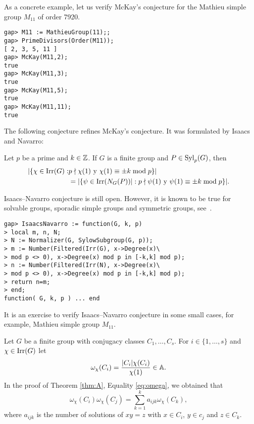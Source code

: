 As a concrete example, let us 
verify McKay's conjecture for the Mathieu simple group 
$M_{11}$ of order 7920. 

\begin{lstlisting}
gap> M11 := MathieuGroup(11);;
gap> PrimeDivisors(Order(M11));
[ 2, 3, 5, 11 ]
gap> McKay(M11,2);
true
gap> McKay(M11,3);
true
gap> McKay(M11,5);
true
gap> McKay(M11,11);
true
\end{lstlisting}

The following conjecture refines McKay's conjecture. It was
formulated by Isaacs and Navarro:

\begin{conjecture}
\label{conjecture:IsaacsNavarro}
Let $p$ be a prime and $k\in\mathbb{Z}$. 
If $G$ is a finite group and $P\in\mathrm{Syl}_p(G)$,
then
\begin{align*}
|\{\chi\in\operatorname{Irr}(G):&p\nmid \chi(1)\text{ y }\chi(1)\equiv\pm k\bmod p\}|\\
&=|\{\psi\in\operatorname{Irr}(N_G(P))|:p\nmid\psi(1)\text{ y }\psi(1)\equiv\pm k\bmod p\}|.
\end{align*}
\end{conjecture}

Isaacs--Navarro conjecture is still open. However, 
it is known to be true for solvable groups, 
sporadic simple groups and 
symmetric groups, see~\cite{MR1935849}. 

\begin{lstlisting}
gap> IsaacsNavarro := function(G, k, p)
> local m, n, N;
> N := Normalizer(G, SylowSubgroup(G, p));
> m := Number(Filtered(Irr(G), x->Degree(x)\
> mod p <> 0), x->Degree(x) mod p in [-k,k] mod p);
> n := Number(Filtered(Irr(N), x->Degree(x)\
> mod p <> 0), x->Degree(x) mod p in [-k,k] mod p);
> return n=m;
> end;
function( G, k, p ) ... end
\end{lstlisting}

It is an exercise to verify Isaacs--Navarro conjecture in some
small cases, for example, Mathieu simple group $M_{11}$. 

\label{commutators}

Let $G$ be a finite group with conjugacy classes $C_1,\dots,C_s$. For
$i\in\{1,\dots,s\}$ and $\chi\in\operatorname{Irr}(G)$ let  
\[
\omega_{\chi}(C_i)=\frac{|C_i|\chi(C_i)}{\chi(1)}\in\mathbb{A}.
\]
In the proof of Theorem \ref{thm:A}, Equality \eqref{eq:omega}, 
we obtained
that 
\begin{equation}
\label{eq:again_omega}
\omega_\chi(C_i)\omega_\chi(C_j)=\sum_{k=1}^ka_{ijk}\omega_{\chi}(C_k),
\end{equation}
where $a_{ijk}$ is the number of solutions 
of $xy=z$ with $x\in C_i$, $y\in c_j$ and $z\in C_k$. 

